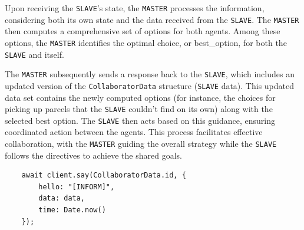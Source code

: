 \documentclass[10pt]{article}
\begin{document}
Upon receiving the \texttt{SLAVE}'s state, the \texttt{MASTER} processes the information, considering both its own state and the data received from the \texttt{SLAVE}. The \texttt{MASTER} then computes a comprehensive set of options for both agents. Among these options, the \texttt{MASTER} identifies the optimal choice, or best\_option, for both the \texttt{SLAVE} and itself.

The \texttt{MASTER} subsequently sends a response back to the \texttt{SLAVE}, which includes an updated version of the \texttt{CollaboratorData} structure (\texttt{SLAVE} data). This updated data set contains the newly computed options (for instance, the choices for picking up parcels that the \texttt{SLAVE} couldn't find on its own) along with the selected best option. The \texttt{SLAVE} then acts based on this guidance, ensuring coordinated action between the agents. This process facilitates effective collaboration, with the \texttt{MASTER} guiding the overall strategy while the \texttt{SLAVE} follows the directives to achieve the shared goals.

\begin{verbatim}
    await client.say(CollaboratorData.id, {
        hello: "[INFORM]",
        data: data,
        time: Date.now()
    });
\end{verbatim}

\end{document}
